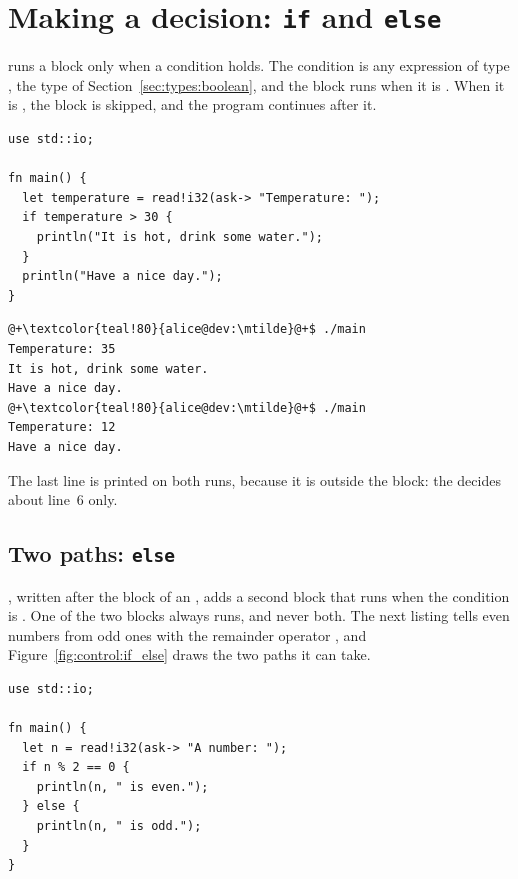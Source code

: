 \vfill\pagebreak
\section{Making a decision: \texttt{if} and \texttt{else}}
\label{sec:control:if}

 runs a block only when a condition holds. The condition is any
expression of type , the type of Section~\ref{sec:types:boolean},
and the block runs when it is . When it is , the block
is skipped, and the program continues after it.

\begin{lstlisting}[style=coloredverbatim, caption=A block run only when a condition holds, label=lst:control:if]
use std::io;

fn main() {
  let temperature = read!i32(ask-> "Temperature: ");
  if temperature > 30 {
    println("It is hot, drink some water.");
  }
  println("Have a nice day.");
}
\end{lstlisting}
\vspace{-10pt}%
\begin{lstlisting}[style=bashVerb, escapechar=@+]
@+\textcolor{teal!80}{alice@dev:\mtilde}@+$ ./main
Temperature: 35
It is hot, drink some water.
Have a nice day.
@+\textcolor{teal!80}{alice@dev:\mtilde}@+$ ./main
Temperature: 12
Have a nice day.
\end{lstlisting}

The last line is printed on both runs, because it is outside the block: the
 decides about line~6 only.

\subsection{Two paths: \texttt{else}}

, written after the block of an , adds a second block that
runs when the condition is . One of the two blocks always runs, and
never both. The next listing tells even numbers from odd ones with the remainder
operator \tokennolst{\%}, and Figure~\ref{fig:control:if_else} draws the two paths it
can take.

\begin{lstlisting}[style=coloredverbatim, caption=Two branches, label=lst:control:if_else]
use std::io;

fn main() {
  let n = read!i32(ask-> "A number: ");
  if n % 2 == 0 {
    println(n, " is even.");
  } else {
    println(n, " is odd.");
  }
}
\end{lstlisting}

